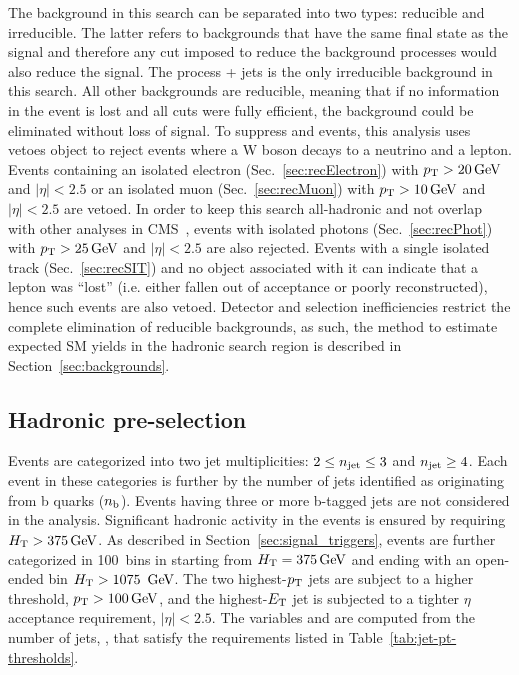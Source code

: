 The background in this search can be separated into two types: 
reducible and irreducible. The latter refers to backgrounds that 
have the same final state as the signal and therefore any cut imposed 
to reduce the background processes would also reduce the signal. The process 
\znunu + jets is the only irreducible background in this search. 
All other backgrounds are reducible, meaning that if no information 
in the event is lost and all cuts were fully efficient, the background 
could be eliminated without loss of signal. To suppress \wj and \ttbar
events, this analysis uses vetoes object to reject events where a W boson 
decays to a neutrino and a lepton. Events containing 
an isolated electron (Sec.~\ref{sec:recElectron}) with $p_{\mathrm{T}} > 20\,\text{Ge\hspace{-.08em}V}$ 
and $|\eta| < 2.5$ or an isolated muon (Sec.~\ref{sec:recMuon})
with $p_{\mathrm{T}} > 10\,\text{Ge\hspace{-.08em}V}$ and $|\eta| < 2.5$ are vetoed. In order to keep this 
search all-hadronic and not overlap with other analyses in 
CMS~\cite{CMS-PAS-SUS-14-008,photon7TeV}, events with isolated 
photons (Sec.~\ref{sec:recPhot}) with $p_{\mathrm{T}} > 25\,\text{Ge\hspace{-.08em}V}$ 
and $|\eta| < 2.5$ are also rejected. Events with a single isolated 
track (Sec.~\ref{sec:recSIT}) and no object associated with it can indicate that
a lepton was ``lost'' (i.e. either fallen out of acceptance or poorly 
reconstructed), hence such events are also vetoed. Detector and selection 
inefficiencies restrict the complete elimination of reducible backgrounds, 
as such, the method to estimate expected SM yields in the hadronic search
region is described in Section~\ref{sec:backgrounds}.

\subsection{Hadronic pre-selection}

Events are categorized into two jet multiplicities: $2 \leq n_{\text{jet}} \leq 3$ and 
$n_{\text{jet}} \geq 4$.  Each event in these categories is further  by the number
of jets identified as originating from b quarks ($n_{\text{b}}$). Events having 
three or more b-tagged jets are not considered in the analysis.      
Significant hadronic activity in the events is ensured by requiring
$\mbox{$H_\text{T}$} > 375\,\text{Ge\hspace{-.08em}V}$. As described in Section~\ref{sec:signal_triggers}, events are further
categorized in 100~\gev bins in \scalht starting from $\mbox{$H_\text{T}$} = 375\,\text{Ge\hspace{-.08em}V}$ and ending with 
an open-ended bin $\mbox{$H_\text{T}$} > 1075~\,\text{Ge\hspace{-.08em}V}$. The two highest-$p_{\mathrm{T}}$ jets are 
subject to a higher threshold, $p_{\mathrm{T}}>100\,\text{Ge\hspace{-.08em}V}$, and the highest-${E_{\text T}}$ jet 
is subjected to a tighter $\eta$ acceptance requirement, $|\eta| < 2.5$. 
The variables \scalht and \mht are computed from the number of jets, 
\njet, that satisfy the \pt requirements listed in Table~\ref{tab:jet-pt-thresholds}. 


